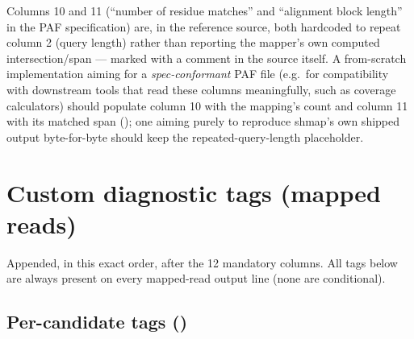 \begin{bugbox}
Columns 10 and 11 (``number of residue matches'' and ``alignment block length'' in the PAF
specification) are, in the reference source, both hardcoded to repeat column 2 (query length)
rather than reporting the mapper's own computed intersection/span --- marked with a
 comment in the source itself. A from-scratch implementation aiming for a
\emph{spec-conformant} PAF file (e.g.\ for compatibility with downstream tools that read these
columns meaningfully, such as coverage calculators) should populate column 10 with the mapping's
 count and column 11 with its matched span (); one aiming
purely to reproduce shmap's own shipped output byte-for-byte should keep the repeated-query-length
placeholder.
\end{bugbox}

\section{Custom diagnostic tags (mapped reads)}

Appended, in this exact order, after the 12 mandatory columns. All tags below are always present
on every mapped-read output line (none are conditional).

\subsection{Per-candidate tags ()}

